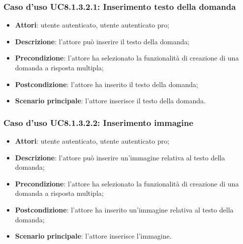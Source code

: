 \subsubsection{Caso d'uso UC8.1.3.2.1: Inserimento testo della domanda}
	\begin{itemize}
		\item
			\textbf{Attori}: utente autenticato, utente autenticato pro;
		\item		
			\textbf{Descrizione}: l'attore può inserire il testo della domanda;
		\item
			\textbf{Precondizione}: l'attore ha selezionato la funzionalità di creazione di una domanda a risposta multipla; 
		\item
			\textbf{Postcondizione}: l'attore ha inserito il testo della domanda;
		\item
			\textbf{Scenario principale}: l'attore inserisce il testo della domanda. 
	 			
	\end{itemize}
	
\subsubsection{Caso d'uso UC8.1.3.2.2: Inserimento immagine}
	\begin{itemize}
		\item
			\textbf{Attori}: utente autenticato, utente autenticato pro;
		\item		
			\textbf{Descrizione}: l'attore può inserire un'immagine relativa al testo della domanda;
		\item
			\textbf{Precondizione}: l'attore ha selezionato la funzionalità di creazione di una domanda a risposta multipla; 
		\item
			\textbf{Postcondizione}: l'attore ha inserito un'immagine relativa al testo della domanda;
		\item
			\textbf{Scenario principale}: l'attore inserisce l'immagine.						
	\end{itemize}


	
